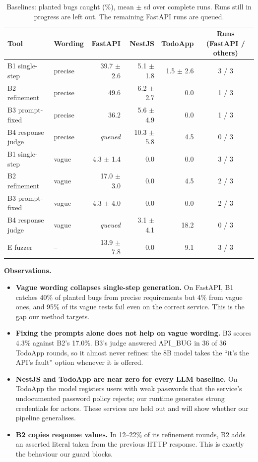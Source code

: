 \documentclass[11pt,a4paper]{article}
\begin{document}
\begin{table}[H]\centering\small
\begin{tabular}{llrrrc}\toprule
Tool & Wording & FastAPI & NestJS & TodoApp & Runs (FastAPI / others)\\\midrule
B1 single-step & precise & 39.7 $\pm$ 2.6 & 5.1 $\pm$ 1.8 & 1.5 $\pm$ 2.6 & 3 / 3\\
B2 refinement & precise & 49.6 & 6.2 $\pm$ 2.7 & 0.0 & 1 / 3\\
B3 prompt-fixed & precise & 36.2 & 5.6 $\pm$ 4.9 & 0.0 & 1 / 3\\
B4 response judge & precise & \emph{queued} & 10.3 $\pm$ 5.8 & 4.5 & 0 / 3\\\midrule
B1 single-step & vague & 4.3 $\pm$ 1.4 & 0.0 & 0.0 & 3 / 3\\
B2 refinement & vague & 17.0 $\pm$ 3.0 & 0.0 & 4.5 & 2 / 3\\
B3 prompt-fixed & vague & 4.3 $\pm$ 4.0 & 0.0 & 0.0 & 2 / 3\\
B4 response judge & vague & \emph{queued} & 3.1 $\pm$ 4.1 & 18.2 & 0 / 3\\\midrule
E fuzzer & -- & 13.9 $\pm$ 7.8 & 0.0 & 9.1 & 3 / 3\\
\bottomrule\end{tabular}
\caption{Baselines: planted bugs caught (\%), mean $\pm$ sd over complete runs. Runs still in progress are left out. The remaining FastAPI runs are queued.}
\label{tab:baselines}
\end{table}
\textbf{Observations.}
\begin{itemize}
\item \textbf{Vague wording collapses single-step generation.} On FastAPI, B1 catches 40\% of planted bugs from precise requirements but 4\% from vague ones, and 95\% of its vague tests fail even on the correct service. This is the gap our method targets.
\item \textbf{Fixing the prompts alone does not help on vague wording.} B3 scores 4.3\% against B2's 17.0\%. B3's judge answered \textsc{API\_BUG} in 36 of 36 TodoApp rounds, so it almost never refines: the 8B model takes the ``it's the API's fault'' option whenever it is offered.
\item \textbf{NestJS and TodoApp are near zero for every LLM baseline.} On TodoApp the model registers users with weak passwords that the service's undocumented password policy rejects; our runtime generates strong credentials for actors. These services are held out and will show whether our pipeline generalises.
\item \textbf{B2 copies response values.} In 12--22\% of its refinement rounds, B2 adds an asserted literal taken from the previous HTTP response. This is exactly the behaviour our guard blocks.
\end{itemize}
\end{document}
